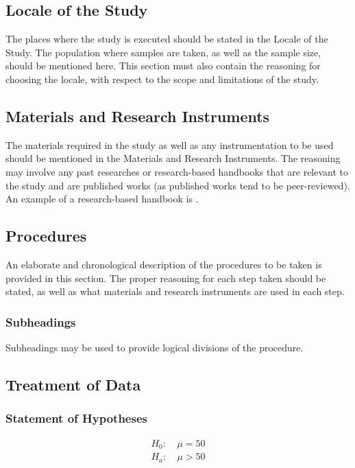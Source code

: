 \documentclass{strrespaper-trad}
\begin{document}
		\subsection{Locale of the Study}
			The places where the study is executed should be stated in the Locale of the Study.
			The population where samples are taken, as well as the sample size, should be mentioned here.
			This section must also contain the reasoning for choosing the locale, with respect to the scope and limitations of the study.

		\subsection{Materials and Research Instruments}
			The materials required in the study as well as any instrumentation to be used should be mentioned in the Materials and Research Instruments.
			The reasoning may involve any past researches or research-based handbooks that are relevant to the study and are published works (as published works tend to be peer-reviewed).
			An example of a research-based handbook is \textcite{letcherWindEnergyEngineering2017}.

		\subsection{Procedures}
			An elaborate and chronological description of the procedures to be taken is provided in this section.
			The proper reasoning for each step taken should be stated, as well as what materials and research instruments are used in each step.
			\subsubsection{Subheadings}
				Subheadings may be used to provide logical divisions of the procedure.


		\subsection{Treatment of Data}
			\subsubsection{Statement of Hypotheses} \vspace{-\baselineskip}
				\begin{align*}
					H_0: & ~ \mu = 50 \\
					H_a: & ~ \mu > 50
				\end{align*}
\end{document}

